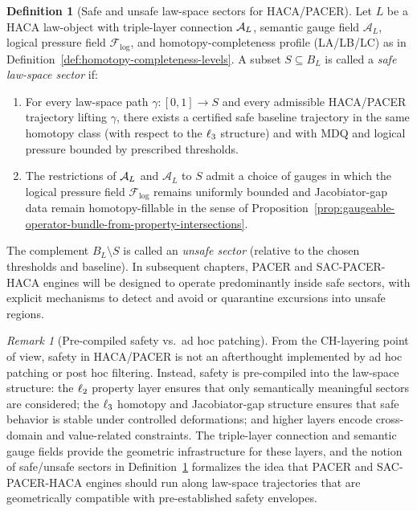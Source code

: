 \documentclass[11pt]{book}
\theoremstyle{plain}
\theoremstyle{definition}
\newtheorem{definition}[theorem]{Definition}
\theoremstyle{remark}
\newtheorem{remark}[theorem]{Remark}
\begin{document}
\begin{definition}[Safe and unsafe law-space sectors for HACA/PACER]
\label{def:safe-unsafe-sectors}
Let $L$ be a HACA law-object with triple-layer connection
$\mathcal{A}_L$, semantic gauge field $\mathcal{A}_L$, logical pressure
field $\mathcal{F}_{\mathrm{log}}$, and homotopy-completeness profile
(LA/LB/LC) as in Definition~\ref{def:homotopy-completeness-levels}.
A subset $S\subseteq B_L$ is called a \emph{safe law-space sector} if:
\begin{enumerate}
  \item For every law-space path $\gamma:[0,1]\to S$ and every
        admissible HACA/PACER trajectory lifting $\gamma$, there exists
        a certified safe baseline trajectory in the same homotopy class
        (with respect to the $\ell_3$ structure) and with MDQ and
        logical pressure bounded by prescribed thresholds.
  \item The restrictions of $\mathcal{A}_L$ and $\mathcal{A}_L$ to $S$ admit
        a choice of gauges in which the logical pressure field
        $\mathcal{F}_{\mathrm{log}}$ remains uniformly bounded and
        Jacobiator-gap data remain homotopy-fillable in the sense of
        Proposition~\ref{prop:gaugeable-operator-bundle-from-property-intersections}.
\end{enumerate}
The complement $B_L\setminus S$ is called an \emph{unsafe sector}
(relative to the chosen thresholds and baseline). In subsequent
chapters, PACER and SAC-PACER-HACA engines will be designed to operate
predominantly inside safe sectors, with explicit mechanisms to detect
and avoid or quarantine excursions into unsafe regions.
\end{definition}

\begin{remark}[Pre-compiled safety vs.\ ad hoc patching]
\label{rem:precompiled-safety}
From the CH-layering point of view, safety in HACA/PACER is not an
afterthought implemented by ad hoc patching or post hoc filtering.
Instead, safety is pre-compiled into the law-space structure: the
$\ell_2$ property layer ensures that only semantically meaningful
sectors are considered; the $\ell_3$ homotopy and Jacobiator-gap
structure ensures that safe behavior is stable under controlled
deformations; and higher layers encode cross-domain and value-related
constraints. The triple-layer connection and semantic gauge fields
provide the geometric infrastructure for these layers, and the notion
of safe/unsafe sectors in Definition~\ref{def:safe-unsafe-sectors}
formalizes the idea that PACER and SAC-PACER-HACA engines should run
along law-space trajectories that are geometrically compatible with
pre-established safety envelopes.
\end{remark}
\end{document}
